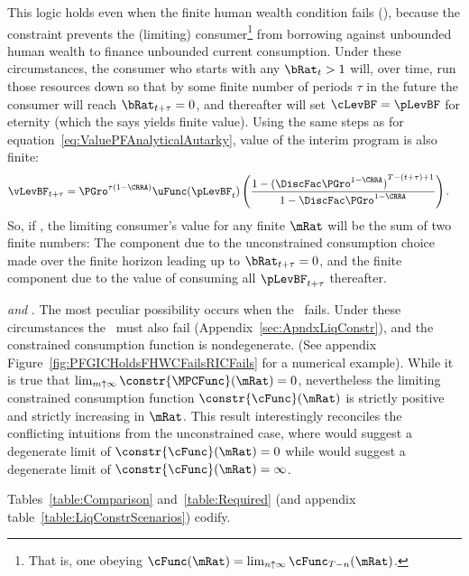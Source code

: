 \documentclass[ProjectDLO]{subfiles}
\begin{document}
This logic holds even when the finite human wealth condition fails (\cncl{\FHWC}), because the constraint prevents the (limiting) consumer\footnote{That is, one obeying $\cFunc(\mRat) = \lim_{n \uparrow \infty} \cFunc_{T-n}(\mRat)$.} from borrowing against unbounded human wealth to finance unbounded current consumption.  Under these circumstances, the consumer who starts with any $\bRat_{t} > 1$ will, over time, run those resources down so that by some finite number of periods $\tau$ in the future the consumer will reach $\bRat_{t+\tau} = 0$, and thereafter will set $\cLevBF = \pLevBF$ for eternity (which the {\PFFVAC} says yields finite value).  Using the same steps as for equation~\eqref{eq:ValuePFAnalyticalAutarky}, value of the interim program is also finite: \hypertarget{PFFVAC}{} \hypertarget{PFVAF}{}
\begin{align*}
  \vLevBF_{t+\tau} %
 & = \PGro^{\tau(1-\CRRA)} \uFunc(\pLevBF_{t})\left(\frac{1-{(\DiscFac \PGro^{1-\CRRA})}^{T-(t+\tau)+1}}{1-\DiscFac \PGro^{1-\CRRA}}\right).
\end{align*}
So, if \cncl{\FHWC}, the limiting consumer's value for any finite $\mRat$ will be the sum of two finite numbers: The component due to the unconstrained consumption choice made over the finite horizon leading up to $\bRat_{t+\tau} = 0$, and the finite component due to the value of consuming all $\pLevBF_{t+\tau}$ thereafter.

\hypertarget{RICandFHWCFail}{} \textit{{\GICRaw} and {\cncl{\RIC}}}.  The most peculiar possibility occurs when the \RIC~fails.  Under these circumstances the \FHWC~must also fail (Appendix~\ref{sec:ApndxLiqConstr}), and the constrained consumption function is nondegenerate.  (See appendix Figure~\ref{fig:PFGICHoldsFHWCFailsRICFails} for a numerical example).  While it is true that $\lim_{m \uparrow \infty} \constr{\MPCFunc}(\mRat) = 0$, nevertheless the limiting constrained consumption function $\constr{\cFunc}(\mRat)$ is strictly positive and strictly increasing in $\mRat$.  This result interestingly reconciles the conflicting intuitions from the unconstrained case, where \cncl{\RIC} would suggest a degenerate limit of $\constr{\cFunc}(\mRat)=0$ while \cncl{\FHWC} would suggest a degenerate limit of $\constr{\cFunc}(\mRat)=\infty$.

Tables~\ref{table:Comparison} and~\ref{table:Required} (and appendix table~\ref{table:LiqConstrScenarios}) codify.
\end{document}
